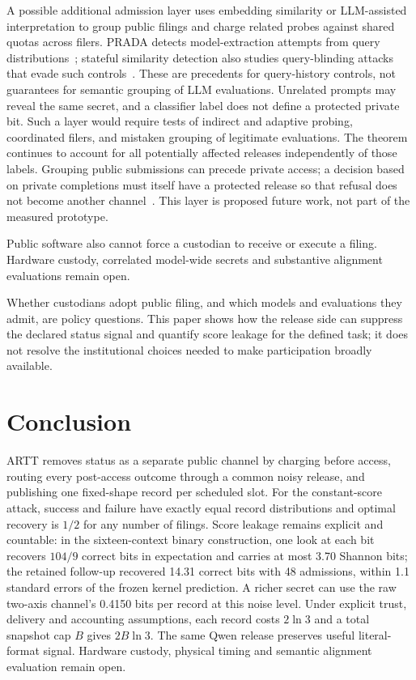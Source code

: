 \documentclass[10pt,twocolumn]{article}
\begin{document}
A possible additional admission layer uses embedding similarity or LLM-assisted interpretation to group public filings and charge related probes against shared quotas across filers. PRADA detects model-extraction attempts from query distributions~\cite{prada}; stateful similarity detection also studies query-blinding attacks that evade such controls~\cite{stateful}. These are precedents for query-history controls, not guarantees for semantic grouping of LLM evaluations. Unrelated prompts may reveal the same secret, and a classifier label does not define a protected private bit. Such a layer would require tests of indirect and adaptive probing, coordinated filers, and mistaken grouping of legitimate evaluations. The theorem continues to account for all potentially affected releases independently of those labels. Grouping public submissions can precede private access; a decision based on private completions must itself have a protected release so that refusal does not become another channel~\cite{dproth}. This layer is proposed future work, not part of the measured prototype.

Public software also cannot force a custodian to receive or execute a filing. Hardware custody, correlated model-wide secrets and substantive alignment evaluations remain open.

Whether custodians adopt public filing, and which models and evaluations they admit, are policy questions. This paper shows how the release side can suppress the declared status signal and quantify score leakage for the defined task; it does not resolve the institutional choices needed to make participation broadly available.

\section{Conclusion}
ARTT removes status as a separate public channel by charging before access, routing every post-access outcome through a common noisy release, and publishing one fixed-shape record per scheduled slot. For the constant-score attack, success and failure have exactly equal record distributions and optimal recovery is $1/2$ for any number of filings. Score leakage remains explicit and countable: in the sixteen-context binary construction, one look at each bit recovers $104/9$ correct bits in expectation and carries at most 3.70 Shannon bits; the retained follow-up recovered 14.31 correct bits with 48 admissions, within 1.1 standard errors of the frozen kernel prediction. A richer secret can use the raw two-axis channel's 0.4150 bits per record at this noise level. Under explicit trust, delivery and accounting assumptions, each record costs $2\ln3$ and a total snapshot cap $B$ gives $2B\ln3$. The same Qwen release preserves useful literal-format signal. Hardware custody, physical timing and semantic alignment evaluation remain open.
\end{document}
